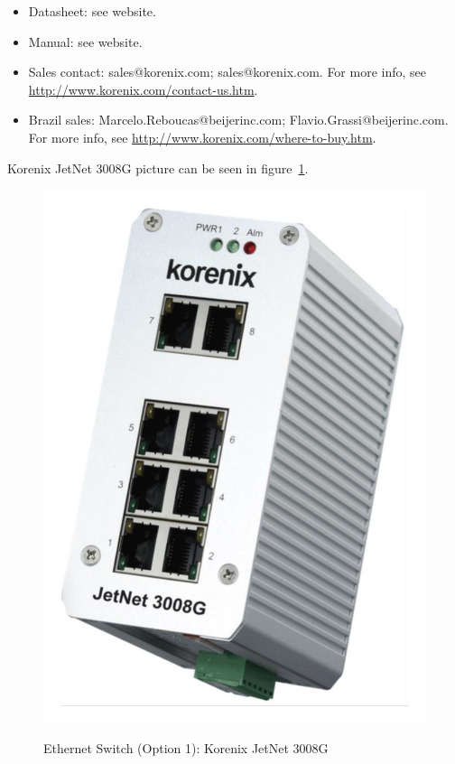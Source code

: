 \begin{itemize}
\begin{itemize}
    \item Datasheet: see website.
    \item Manual: see website.
    \item Sales contact: sales@korenix.com; sales@korenix.com. For more info, see \href{http://www.korenix.com/contact-us.htm}{http://www.korenix.com/contact-us.htm}.
    \item Brazil sales: Marcelo.Reboucas@beijerinc.com; Flavio.Grassi@beijerinc.com. For more info, see \href{http://www.korenix.com/where-to-buy.htm}{http://www.korenix.com/where-to-buy.htm}.
  \end{itemize}
\end{itemize}
Korenix JetNet 3008G picture can be seen in figure~\ref{FIG:DEVICESWITCHOPTION1}.
\begin{figure}
  \centering
  \includegraphics[angle=90,width=1\columnwidth]{figs/body02/FIGDEVICESWITCHOPTION1.pdf}\\
  \caption[Ethernet Switch (Option 1): Korenix JetNet 3008G]{Ethernet Switch (Option 1): Korenix JetNet 3008G}
  \label{FIG:DEVICESWITCHOPTION1}
\end{figure}
